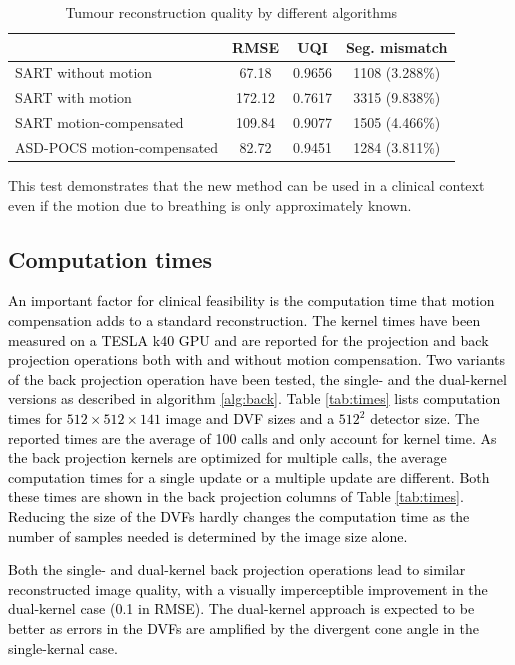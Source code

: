 \begin{table}[H]
\begin{center}
\caption{Tumour reconstruction quality by different algorithms}
\label{tab:quality}
\begin{tabular}{|l|| c | c | c |}
\hline
 & RMSE & UQI & Seg. mismatch \\
\hline \hline  
 SART without motion & 67.18 & 0.9656 & 1108 (3.288\%)\\
 SART with motion & 172.12 & 0.7617 & 3315 (9.838\%)\\
 SART motion-compensated & 109.84 & 0.9077 & 1505 (4.466\%)\\
 ASD-POCS motion-compensated & 82.72 & 0.9451 & 1284 (3.811\%)\\
\hline  
\end{tabular}
\end{center}
\end{table}

This test demonstrates that the new method can be used in a clinical context even if the motion due to breathing is only approximately known.



\subsection{Computation times}
\textcolor{black}{An important factor for clinical feasibility is the computation time that motion compensation adds to a standard reconstruction. The kernel times have been measured on a TESLA k40 GPU and are reported for the projection and back projection operations both with and without motion compensation. Two variants of the back projection operation have been tested, the single- and the dual-kernel versions as described in algorithm \ref{alg:back}. Table \ref{tab:times} lists computation times for $512\times 512 \times 141$ image and DVF sizes and a $512^2$ detector size. The reported times are the average of 100 calls and only account for kernel time. As the back projection kernels are optimized for multiple calls, the average computation times for a single update or a multiple update are different. Both these times are shown in the back projection columns of Table \ref{tab:times}. Reducing the size of the DVFs hardly changes the computation time as the number of samples needed is determined by the image size alone.}

\textcolor{black}{Both the single- and dual-kernel back projection operations lead to similar reconstructed image quality, with a visually imperceptible improvement in the dual-kernel case (0.1 in RMSE). The dual-kernel approach is expected to be better as errors in the DVFs are amplified by the divergent cone angle in the single-kernal case.}

